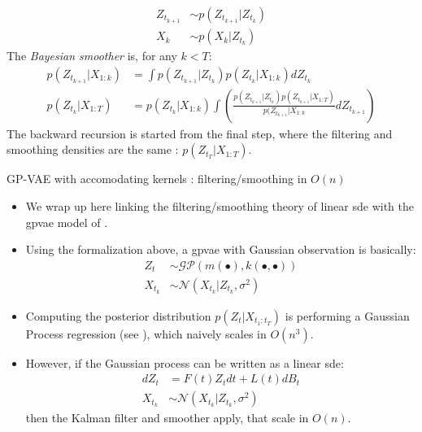 \begin{frame}
            \begin{tcolorbox}[colback=blue!5!white,colframe=black!75!black,title=Bayesian smoother]
                \begin{align}
                    Z_{t_{k+1}} &\sim p(Z_{t_{k+1}} \vert Z_{t_k}) \\
                    X_k &\sim p(X_k \vert Z_{t_k})
                \end{align}
                The \textit{Bayesian smoother} is, for any $k < T$:
                \begin{align}
                    p(Z_{t_{k+1}} \vert X_{1:k}) &= \int p(Z_{t_{k+1}} \vert Z_{t_k}) p(Z_{t_k} \vert X_{1:k}) dZ_{t_k} \\
                    p(Z_{t_k} \vert X_{1:T}) &= p(Z_{t_{k}} \vert X_{1:k})\int \left(
                        \frac{
                            p(Z_{t_{k+1}} \vert Z_{t_k}) p(Z_{t_{k+1}} \vert X_{1:T})
                        }{
                            p(Z_{t_{k+1}} \vert X_{1:k}
                        }dZ_{t_{k+1}}
                    \right)
                \end{align}
                The backward recursion is started from the final step, where the filtering and smoothing densities 
                are the same : $p(Z_{t_T} \vert X_{1:T})$.
            \end{tcolorbox}
\end{frame}


\begin{frame}{GP-VAE with accomodating kernels : filtering/smoothing in $O(n)$}
    \begin{itemize}
        \item We wrap up here linking the filtering/smoothing theory of linear \gls{sde} with the \gls{gpvae} 
model of \cite{fortuin_gp-vae:_2020}.
        \item Using the formalization above, a \gls{gpvae} with Gaussian observation is basically:
            \begin{align}
                \label{gpvae gaussian observation}
                Z_t &\sim \mathcal{GP}(m(\bullet), k(\bullet, \bullet)) \\
                X_{t_k} &\sim \mathcal{N}(X_{t_k} \vert Z_{t_k}, \sigma^{2})
            \end{align}
        \item Computing the posterior distribution $p(Z_t \vert X_{t_1:t_T})$ is performing a Gaussian Process 
regression (see \cite{rasmussen_gaussian_2008}), which naively scales in $O(n^{3})$.
        \item However, if the Gaussian process can be written as a linear \gls{sde}:
            \begin{align}
                \label{gpvae linear sde form}
                dZ_t &= F(t)Z_t dt + L(t)dB_t \\
                X_{t_k} &\sim \mathcal{N}(X_{t_k} \vert Z_{t_k}, \sigma^{2})
            \end{align}
            then the Kalman filter and smoother apply, that scale in $O(n)$. 
    \end{itemize}
\end{frame}

